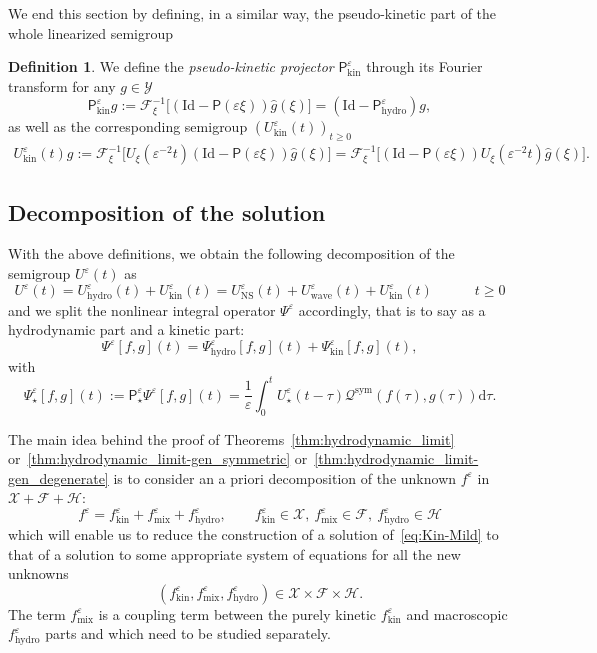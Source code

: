 \documentclass[10pt]{amsart}
\theoremstyle{definition}\newtheorem{defi}[theo]{Definition}\newtheorem{rema}[theo]{Remark}\newtheorem{exam}[theo]{Example}\newtheorem{exem}[theo]{Example}\newtheorem{nota}[theo]{Notation}
\newcommand{\ns}{\mathrm{NS}}
\newcommand{\hyd}{\mathrm{hydro}}
\newcommand{\mix}{\mathrm{mix}}
\newcommand{\kin}{\mathrm{kin}}
\newcommand{\sym}{\mathrm{sym}}
\newcommand{\Id}{\mathrm{Id}}
\renewcommand{\d}{\mathrm{d}}
\newcommand{\Wave}{\mathrm{wave}}
\newcommand{\FF}{\mathcal{F}}
\newcommand{\PP}{\mathsf{P}}
\newcommand{\QQ}{\mathcal{Q}}
\newcommand{\VV}{\mathcal{Y}}
\newcommand{\FFF}{\mathscr{F}}
\newcommand{\HHH}{\mathscr{H}}
\newcommand{\GGG}{\mathscr{X}}
\newcommand{\SSSs}{\HHH}
\newcommand{\SSSl}{\GGG}
\newcommand{\SSSm}{\FFF}
\newcommand{\SSg}{\VV}
\renewcommand*\ge{\geqslant}
\newcommand*\eps{{\varepsilon}}
\begin{document}
We end this section by defining, in a similar way, the pseudo-kinetic part of the whole linearized semigroup

\begin{defi}\label{def:kinetic_semigroups}
We define the \emph{pseudo-kinetic projector} $\PP_\kin^\eps$ through its Fourier transform for any $g \in \SSg$
\begin{equation*}
\PP_\kin^\eps g := \FF_\xi^{-1} \Big[\left(\Id - \PP(\eps \xi)\right) \widehat{g}(\xi) \Big] = \left(\Id - \PP^\eps_\hyd\right) g,
\end{equation*}
as well as the corresponding semigroup $\left(U^\eps_\kin(t)\right)_{t\ge0}$
\begin{align*}
U^\eps_\kin(t)g := \FF^{-1}_\xi \Big[U_{\xi}\left(\eps^{-2}t\right)\left(\Id - \PP(\eps \xi) \right) \widehat{g}(\xi) \Big]=\FF^{-1}_\xi \Big[\left(\Id - \PP(\eps \xi) \right)U_{\xi}\left(\eps^{-2}t\right)\widehat{g}(\xi) \Big].
\end{align*}
\end{defi}

\subsection{Decomposition of the solution}

With the above definitions, we obtain the following decomposition of the semigroup $U^\eps(t)$ as
\begin{equation}\label{eq:decompUeps}
U^\eps(t) = U^\eps_\hyd(t) + U^\eps_\kin(t) =U^\eps_\ns(t)+U^\eps_\Wave(t) + U^\eps_\kin(t)\qquad \quad t\ge0
\end{equation}
and we split the nonlinear integral operator $\Psi^\eps$ accordingly, that is to say as a hydrodynamic part and a kinetic part:
\[
\Psi^\eps[f,g](t) = \Psi^\eps_\hyd [f, g](t) + \Psi^\eps_\kin [f, g](t),
\]
with
\[
\Psi^\eps_\star [f, g](t) := \PP^\eps_\star \Psi^\eps[f,g](t) = \frac{1}{\eps} \int_0^t U^\eps_\star(t - \tau) \QQ^\sym (f(\tau), g(\tau)) \d \tau.
\]

The main idea behind the proof of Theorems~\ref{thm:hydrodynamic_limit} or~\ref{thm:hydrodynamic_limit-gen_symmetric} or~\ref{thm:hydrodynamic_limit-gen_degenerate} is to consider an a priori decomposition of the unknown $f^\eps$ in $\SSSl + \SSSm + \SSSs$:
\begin{equation}\label{eq:decompfeps}
f^\eps = f^\eps_\kin + f^\eps_\mix + f^\eps_\hyd, \qquad f^\eps_\kin \in \SSSl,~f^\eps_\mix \in \SSSm,~f^\eps_\hyd \in \SSSs
\end{equation}
which will enable us to reduce the construction of a solution of~\eqref{eq:Kin-Mild} to that of a solution to some appropriate system of equations for all the new unknowns
\[
\left(f^\eps_\kin,f^\eps_\mix,f^\eps_\hyd\right) \in \SSSl\times \SSSm\times \SSSs.
\]
The term $f^\eps_\mix$ is a coupling term between the purely kinetic $f^\eps_\kin$ and macroscopic $f^\eps_\hyd$ parts and which need to be studied separately.
\end{document}
